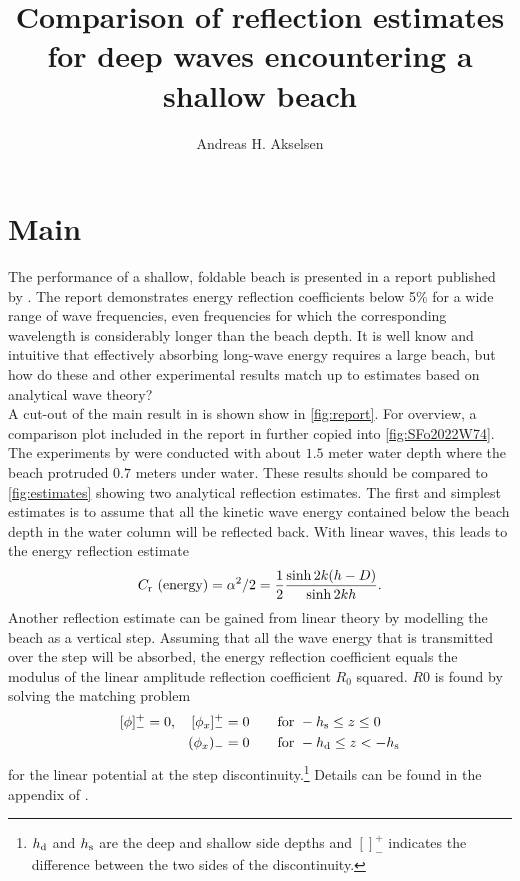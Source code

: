 \documentclass[internal]{sintefmemo}
\title{Comparison of reflection estimates for deep waves encountering a shallow beach}
\author{Andreas H. Akselsen}
\renewcommand{\_}[1]{_\mr{#1}}
\begin{document}
\frontmatter


\section{Main}
The performance of a shallow, foldable beach is presented in a report published by \citet{tiedeman2012}.
The report demonstrates energy reflection coefficients below 5\% for a wide range of wave frequencies, even frequencies for which the corresponding wavelength is considerably longer than the beach depth. 
It is well know and intuitive that effectively absorbing long-wave energy requires a large beach, but how do these and other experimental results match up to estimates based on analytical wave theory?
\\

A cut-out of the main result in \citet{tiedeman2012} is shown show in \cref{fig:report}. 
For overview, a comparison plot included in the report \citet{SFo2022W74} in further copied into \cref{fig:SFo2022W74}.
The experiments by \citet{tiedeman2012} were conducted with about $1.5$ meter water depth where the beach protruded $0.7$ meters under water. 
These results should be compared to \cref{fig:estimates} showing two analytical reflection estimates. 
The first and simplest estimates is to assume that all the kinetic wave energy contained below the beach depth in the water column will be reflected back. 
With linear waves, this leads to the energy reflection estimate
\begin{equation}
C\_r \text{ (energy)} = \alpha^2/2 = \frac12\frac{\sinh 2k(h-D)}{\sinh2kh}.
\label{eq:kinEnergy}
\end{equation}
Another reflection estimate can be gained from linear theory by modelling the beach as a vertical step. 
Assuming that all the wave energy that is transmitted over the step will be absorbed, the energy reflection coefficient equals the modulus of the linear amplitude reflection coefficient $R_0$ squared.
$R0$ is found by solving the matching problem 
\begin{equation}
\begin{aligned}
[\phi]_-^+ = 0,\quad [\phi_x]_-^+ = 0 \qquad &\text{for }-h\_s\leq z\leq0
\\
(\phi_x)_- = 0 \qquad &\text{for }-h\_d\leq z< -h\_s
\end{aligned}
\label{eq:matching}
\end{equation}
for the linear potential at the step discontinuity.\footnote{$h\_d$ and $h\_s$ are the deep and shallow side depths and $[]_-^+$ indicates the difference between the two sides of the discontinuity.} Details can be found in the appendix of \citet{li_2021_step1}.
\end{document}
